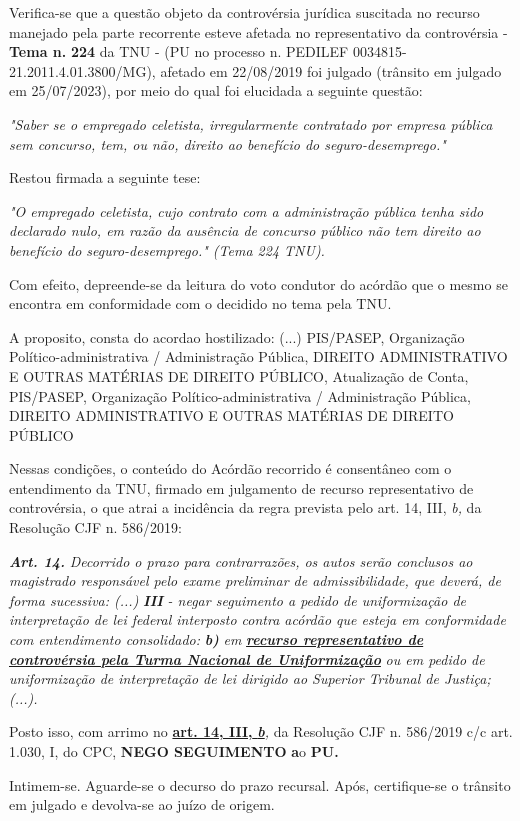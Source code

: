 \documentclass[12pt]{article}
\begin{document}
\justifying
\noindent Verifica-se que a questão objeto da controvérsia jurídica suscitada no recurso manejado pela parte recorrente esteve afetada no representativo da controvérsia - \textbf{Tema n. }\textbf{224} da TNU - (PU no processo n. PEDILEF 0034815-21.2011.4.01.3800/MG),  afetado em 22/08/2019 foi julgado (trânsito em julgado em 25/07/2023), por meio do qual foi elucidada a seguinte questão:

\noindent \textit{"Saber se o empregado celetista, irregularmente contratado por empresa pública sem concurso, tem, ou não, direito ao benefício do seguro-desemprego."}

\noindent Restou firmada a seguinte tese:

\noindent \textit{"O empregado celetista, cujo contrato com a administração pública tenha sido declarado nulo, em razão da ausência de concurso público não tem direito ao benefício do seguro-desemprego." (Tema 224 TNU).}

\noindent Com efeito, depreende-se da leitura do voto condutor do acórdão que o mesmo se encontra em conformidade com o decidido no  tema pela TNU.

\noindent A proposito, consta do acordao hostilizado: (...) PIS/PASEP, Organização Político-administrativa / Administração Pública, DIREITO ADMINISTRATIVO E OUTRAS MATÉRIAS DE DIREITO PÚBLICO, Atualização de Conta, PIS/PASEP, Organização Político-administrativa / Administração Pública, DIREITO ADMINISTRATIVO E OUTRAS MATÉRIAS DE DIREITO PÚBLICO

\noindent Nessas condições, o conteúdo do Acórdão recorrido é consentâneo com o entendimento da TNU, firmado em julgamento de recurso representativo de controvérsia, o que atrai a incidência da regra prevista pelo art. 14, III, \textit{b,} da Resolução CJF n. 586/2019:

\noindent \textit{\textbf{Art. 14.}}\textit{ Decorrido o prazo para contrarrazões, os autos serão conclusos ao magistrado responsável pelo exame preliminar de admissibilidade, que deverá, de forma sucessiva: (...) }\textit{\textbf{III }}\textit{- negar seguimento a pedido de uniformização de interpretação de lei federal interposto contra acórdão que esteja em conformidade com entendimento consolidado: }\textit{\textbf{b)}}\textit{ em }\uline{\textit{\textbf{recurso representativo de controvérsia pela Turma Nacional de Uniformização}}}\textit{ ou em pedido de uniformização de interpretação de lei dirigido ao Superior Tribunal de Justiça;(...).}

\noindent Posto isso, com arrimo no \uline{\textbf{art. 14, III, }}\uline{\textit{\textbf{b}}}\textit{,} da Resolução CJF n. 586/2019 c/c art. 1.030, I, do CPC, \textbf{NEGO SEGUIMENTO }\textbf{a}o\textbf{ PU}\textbf{.}

\noindent Intimem-se. Aguarde-se o decurso do prazo recursal. Após, certifique-se o trânsito em julgado e devolva-se ao juízo de origem.
\end{document}
